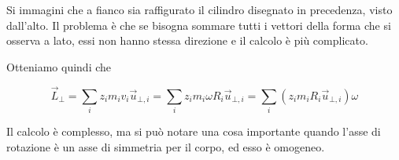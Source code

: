 \begin{figure}[htpb]
\end{figure}
\FloatBarrier
Si immagini che a fianco sia raffigurato il cilindro disegnato in precedenza, visto dall'alto. Il problema è che se bisogna sommare tutti i vettori della forma che si osserva a lato, essi non hanno stessa direzione e il calcolo è più complicato.

Otteniamo quindi che

\[
	\vec{L}_{\bot} = \sum_i z_i m_i v_i \vec{u}_{\bot,i} = \sum_i z_i m_i\omega R_i\vec{u}_{\bot,i} = \sum_i (z_i m_i R_i \vec{u}_{\bot,i})\omega
\]

Il calcolo è complesso, ma si può notare una cosa importante quando l'asse di rotazione è un asse di simmetria per il corpo, ed esso è omogeneo.

